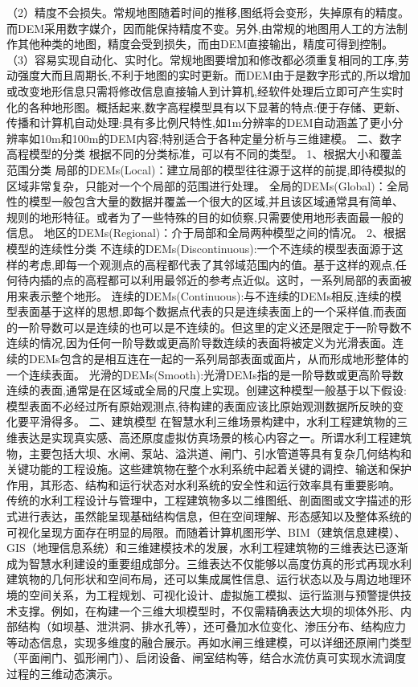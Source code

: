 {{（2）精度不会损失。常规地图随着时间的推移,图纸将会变形，失掉原有的精度。而DEM采用数字媒介，因而能保持精度不变。另外,由常规的地图用人工的方法制作其他种类的地图，精度会受到损失，而由DEM直接输出，精度可得到控制。
（3）容易实现自动化、实时化。常规地图要增加和修改都必须重复相同的工序,劳动强度大而且周期长,不利于地图的实时更新。而DEM由于是数字形式的,所以增加或改变地形信息只需将修改信息直接输人到计算机,经软件处理后立即可产生实时化的各种地形图。概括起来,数字高程模型具有以下显著的特点:便于存储、更新、传播和计算机自动处理:具有多比例尺特性,如1m分辨率的DEM自动涵盖了更小分辨率如10m和100m的DEM内容;特别适合于各种定量分析与三维建模。
二、数字高程模型的分类 根据不同的分类标准，可以有不同的类型。 1、根据大小和覆盖范围分类 局部的DEMs(Local)：建立局部的模型往往源于这样的前提,即待模拟的区域非常复杂，只能对一个个局部的范围进行处理。
全局的DEMs(Global)：全局性的模型一般包含大量的数据并覆盖一个很大的区域,并且该区域通常具有简单、规则的地形特征。或者为了一些特殊的目的如侦察,只需要使用地形表面最一般的信息。
地区的DEMs(Regional)：介于局部和全局两种模型之间的情况。 2、根据模型的连续性分类
不连续的DEMs(Discontinuous):一个不连续的模型表面源于这样的考虑,即每一个观测点的高程都代表了其邻域范围内的值。基于这样的观点,任何待内插的点的高程都可以利用最邻近的参考点近似。这时，一系列局部的表面被用来表示整个地形。
连续的DEMs(Continuous):与不连续的DEMs相反,连续的模型表面基于这样的思想,即每个数据点代表的只是连续表面上的一个采样值,而表面的一阶导数可以是连续的也可以是不连续的。但这里的定义还是限定于一阶导数不连续的情况,因为任何一阶导数或更高阶导数连续的表面将被定义为光滑表面。连续的DEMs包含的是相互连在一起的一系列局部表面或面片，从而形成地形整体的一个连续表面。
光滑的DEMs(Smooth):光滑DEMs指的是一阶导数或更高阶导数连续的表面,通常是在区域或全局的尺度上实现。创建这种模型一般基于以下假设:模型表面不必经过所有原始观测点,待构建的表面应该比原始观测数据所反映的变化要平滑得多。
二、建筑模型
在智慧水利三维场景构建中，水利工程建筑物的三维表达是实现真实感、高还原度虚拟仿真场景的核心内容之一。所谓水利工程建筑物，主要包括大坝、水闸、泵站、溢洪道、闸门、引水管道等具有复杂几何结构和关键功能的工程设施。这些建筑物在整个水利系统中起着关键的调控、输送和保护作用，其形态、结构和运行状态对水利系统的安全性和运行效率具有重要影响。
传统的水利工程设计与管理中，工程建筑物多以二维图纸、剖面图或文字描述的形式进行表达，虽然能呈现基础结构信息，但在空间理解、形态感知以及整体系统的可视化呈现方面存在明显的局限。而随着计算机图形学、BIM（建筑信息建模）、GIS（地理信息系统）和三维建模技术的发展，水利工程建筑物的三维表达已逐渐成为智慧水利建设的重要组成部分。三维表达不仅能够以高度仿真的形式再现水利建筑物的几何形状和空间布局，还可以集成属性信息、运行状态以及与周边地理环境的空间关系，为工程规划、可视化设计、虚拟施工模拟、运行监测与预警提供技术支撑。例如，在构建一个三维大坝模型时，不仅需精确表达大坝的坝体外形、内部结构（如坝基、泄洪洞、排水孔等），还可叠加水位变化、渗压分布、结构应力等动态信息，实现多维度的融合展示。再如水闸三维建模，可以详细还原闸门类型（平面闸门、弧形闸门）、启闭设备、闸室结构等，结合水流仿真可实现水流调度过程的三维动态演示。
}}
